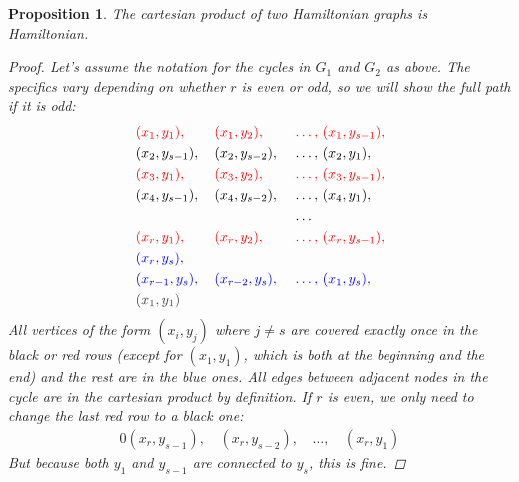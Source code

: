 \documentclass{amsart}
\theoremstyle{plain}
\newtheorem*{proposition}{\textbf{Proposition}}
\theoremstyle{definition}
\begin{document}
    \begin{proposition}
        The cartesian product of two Hamiltonian graphs is Hamiltonian.
        \begin{proof}
            \vspace{-6mm}
            Let's assume the notation for the cycles in $G_1$ and $G_2$ as above.
            The specifics vary depending on whether $r$ is even or odd, so we will show the full path if it is odd:
             \begin{alignat*}{0}
                    & \color{red} (x_1, y_1),\, && \color{red} (x_1, y_2),\, && \color{red} \ldots , \, (x_1, y_{s-1}),  \\
                    & (x_2, y_{s-1}),\, && (x_2, y_{s-2}),\, && \ldots , \,  (x_2, y_1), \\
                    & \color{red} (x_3, y_1),\, && \color{red} (x_3, y_2),\, && \color{red} \ldots, \,(x_3, y_{s-1}),  \\
                    & (x_4, y_{s-1}),\, && (x_4, y_{s-2}),\, && \ldots , \,  (x_4, y_1),  \\
                    &&&&& \ldots  \\
                    & \color{red}(x_r, y_1),\, && \color{red}(x_r, y_2),\, && \color{red}\ldots, \,  (x_r, y_{s-1}), \\
                    & \color{blue} (x_r, y_s), \\
                    & \color{blue} (x_{r-1}, y_s),\, && \color{blue} (x_{r-2}, y_{s}),\, && \color{blue} \ldots, \color{blue} \,  (x_1, y_s), \\
                    & \color{darkgray}(x_1, y_1) &&&&
             \end{alignat*}
            All vertices of the form $(x_i, y_j)$ where
            $j \neq s$ are covered exactly once in the black or \color{red} red \color{black} rows
            (except for $(x_1, y_1)$, which is both at the beginning and the end)
            and the rest are in the \color{blue} blue \color{black} \color{black} ones.
            All edges between adjacent nodes in the cycle are in the cartesian product by definition.
            If $r$ is even, we only need to change the last \color{red} red \color{black} row to a black one:
            \begin{alignat*}{0}
                 (x_r, y_{s-1}),\, & (x_r, y_{s-2}),\, & \ldots, \, &(x_r, y_1)
            \end{alignat*}
            But because both $y_1$ and $y_{s-1}$ are connected to $y_s$, this is fine.
                \end{proof}
    \end{proposition}
\end{document}
